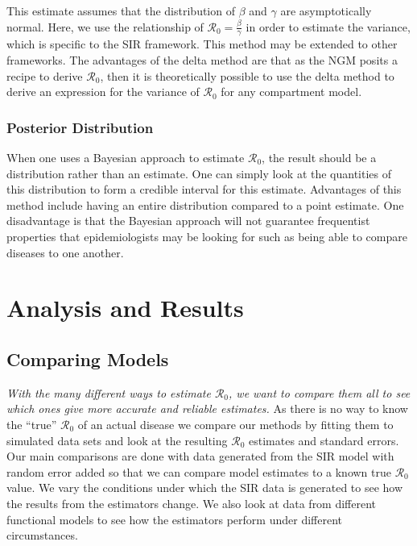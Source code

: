 \documentclass[12pt]{article}
\newcommand{\rr}{\ensuremath{\mathcal{R}_0}}
\begin{document}
This estimate assumes that the distribution of $\beta$ and $\gamma$ are asymptotically normal.  Here, we use the relationship of $\rr = \frac{\beta}{\gamma}$ in order to estimate the variance, which is specific to the SIR framework.  This method may be extended to other frameworks.  The advantages of the delta method are that as the NGM posits a recipe to derive $\rr$, then it is theoretically possible to use the delta method to derive an expression for the variance of $\rr$ for any compartment model.


\subsubsection{Posterior Distribution}
When one uses a Bayesian approach to estimate $\rr$, the result should be a distribution rather than an estimate.  One can simply look at the quantities of this distribution to form a credible interval for this estimate.  Advantages of this method include having an entire distribution compared to a point estimate.  One disadvantage is that the Bayesian approach will not guarantee frequentist properties that epidemiologists may be looking for such as being able to compare diseases to one another.







\section{Analysis and Results}
\label{sec:results}

\subsection{Comparing Models}

\textit{With the many different ways to estimate $\rr$, we want to compare them all to see which ones give more accurate and reliable estimates.}  As there is no way to know the ``true'' $\rr$ of an actual disease we compare our methods by fitting them to simulated data sets and look at the resulting $\rr$ estimates and standard errors. Our main comparisons are done with data generated from the SIR model with random error added so that we can compare model estimates to a known true $\rr$ value. We vary the conditions under which the SIR data is generated to see how the results from the estimators change. We also look at data from different functional models to see how the estimators perform under different circumstances.
\end{document}
